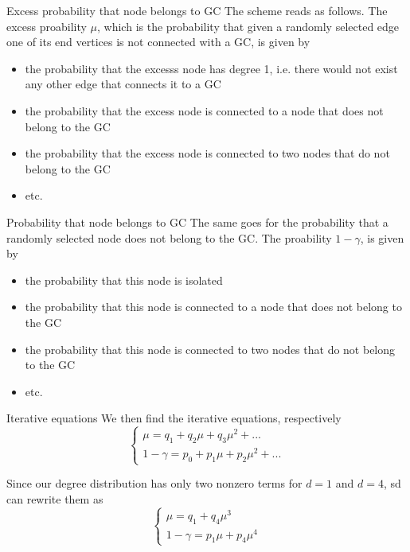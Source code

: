 \documentclass[handout]{beamer}
\begin{document}
\begin{frame}{Excess probability that node belongs to GC}
    The scheme reads as follows. The excess proability $\mu$, which is
    the probability that given a randomly selected edge one of its end vertices
    is not connected with a GC, is given by
    \begin{itemize}
        \item the probability that the excesss node has degree 1, i.e. there
            would not exist any other edge that connects it to a GC
        \item the probability that the excess node is connected to a node that
            does not belong to the GC
        \item the probability that the excess node is connected to two nodes
            that do not belong to the GC
        \item etc.
    \end{itemize}
\end{frame}

\begin{frame}{Probability that node belongs to GC}
    The same goes for the probability that a randomly selected node does not
    belong to the GC. The proability $1-\gamma$, is given by
    \begin{itemize}
        \item the probability that this node is isolated
        \item the probability that this node is connected to a node that does
            not belong to the GC
        \item the probability that this node is connected to two nodes that do
            not belong to the GC
        \item etc.
    \end{itemize}
\end{frame}

\begin{frame}{Iterative equations}
    We then find the iterative equations, respectively
    \begin{equation}
        \begin{cases}
            \mu = q_1 + q_2 \mu + q_3 \mu^2 + ...\\
            1 - \gamma = p_0 + p_1 \mu + p_2 \mu^2 + ...
        \end{cases}
        \label{eq:iterative}
    \end{equation}

    Since our degree distribution has only two nonzero terms for $d=1$ and
    $d=4$, sd can rewrite them as
    \begin{equation}
        \begin{cases}
            \mu = q_1 + q_4 \mu^3\\
            1 - \gamma = p_1 \mu + p_4 \mu^4
        \end{cases}
        \label{eq:iterative_cm}
    \end{equation}
\end{frame}
\end{document}
